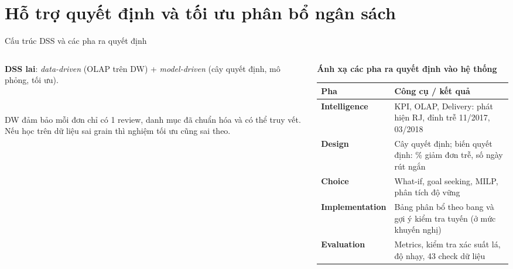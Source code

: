\documentclass[aspectratio=169,10pt,xcolor=table]{beamer}
\newcommand{\presenter}{}
\newcommand{\setpresenter}[1]{\renewcommand{\presenter}{#1}}
\begin{document}
\setpresenter{Nguyễn Minh Khánh}
\section{Hỗ trợ quyết định và tối ưu phân bổ ngân sách}

\begin{frame}{Cấu trúc DSS và các pha ra quyết định}
  \begin{columns}[T]
    \begin{column}{0.4\textwidth}
      \footnotesize
      \textbf{DSS lai}: \emph{data-driven} (OLAP trên DW) + \emph{model-driven} (cây quyết định, mô phỏng, tối ưu).\\[0.15cm]
      \\[0.15cm]
      {\scriptsize DW đảm bảo mỗi đơn chỉ có 1 review, danh mục đã chuẩn hóa và có thể truy vết. Nếu học trên dữ liệu sai grain thì nghiệm tối ưu cũng sai theo.\par}
    \end{column}
    \begin{column}{0.57\textwidth}
      \footnotesize
      \textbf{Ánh xạ các pha ra quyết định vào hệ thống}\\[0.1cm]
      \renewcommand{\arraystretch}{1.25}
      \begin{tabular}{@{}P{2.1cm}P{5.4cm}@{}}
        \toprule
        Pha & Công cụ / kết quả\\
        \midrule
        \textbf{Intelligence} & KPI, OLAP, Delivery: phát hiện RJ, đỉnh trễ 11/2017, 03/2018\\
        \textbf{Design} & Cây quyết định; biến quyết định: \% giảm đơn trễ, số ngày rút ngắn\\
        \textbf{Choice} & What-if, goal seeking, MILP, phân tích độ vững\\
        \textbf{Implementation} & Bảng phân bổ theo bang và gợi ý kiểm tra tuyến (ở mức khuyến nghị)\\
        \textbf{Evaluation} & Metrics, kiểm tra xác suất lá, độ nhạy, 43 check dữ liệu\\
        \bottomrule
      \end{tabular}
    \end{column}
  \end{columns}
\end{frame}
\end{document}
